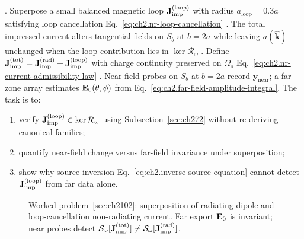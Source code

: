 \cite{stratton1941}. Superpose a small balanced magnetic loop \(\mathbf{J}_{\mathrm{imp}}^{(\mathrm{loop})}\) with
radius \(a_{\mathrm{loop}}=0.3a\) satisfying loop cancellation
Eq.~\eqref{eq:ch2.nr-loop-cancellation} \cite{devaney2004}. The total impressed current alters
tangential fields on $S_b$ at $b=2a$ while leaving $a(\widehat{\mathbf{k}})$ unchanged when the
loop contribution lies in \(\ker\mathcal{R}_\omega\) \cite{hansen1988}.
Define
\(\mathbf{J}_{\mathrm{imp}}^{(\mathrm{tot})}=\mathbf{J}_{\mathrm{imp}}^{(\mathrm{rad})}+\mathbf{J}_{\mathrm{imp}}^{(\mathrm{loop})}\) with charge continuity
preserved on \(\Omega_s\) Eq.~\eqref{eq:ch2.nr-current-admissibility-law}
\cite{stratton1941}. Near-field probes on \(S_b\) at \(b=2a\) record \(\mathbf{y}_{\mathrm{near}}\);
a far-zone array estimates \(\mathbf{E}_0(\theta,\phi)\) from Eq.~\eqref{eq:ch2.far-field-amplitude-integral}.
The task is to:
\begin{enumerate}
\item[(a)] verify \(\mathbf{J}_{\mathrm{imp}}^{(\mathrm{loop})}\in\ker\mathcal{R}_\omega\) using Subsection~\ref{sec:ch272}
without re-deriving canonical families;
\item[(b)] quantify near-field change versus far-field invariance under superposition;
\item[(c)] show why source inversion Eq.~\eqref{eq:ch2.inverse-source-equation} cannot detect
\(\mathbf{J}_{\mathrm{imp}}^{(\mathrm{loop})}\) from far data alone.
\end{enumerate}
\begin{figure}[t]
\centering
{}
\caption{Worked problem~\ref{sec:ch2102}: superposition of radiating dipole and loop-cancellation
non-radiating current. Far export \(\mathbf{E}_0\) is invariant; near probes detect \(\mathcal{S}_\omega[\mathbf{J}_{\mathrm{imp}}^{(\mathrm{tot})}]\neq\mathcal{S}_\omega[\mathbf{J}_{\mathrm{imp}}^{(\mathrm{rad})}]\).}
\label{fig:ch2.wp-nr-superposition-invisibility}
\end{figure}
